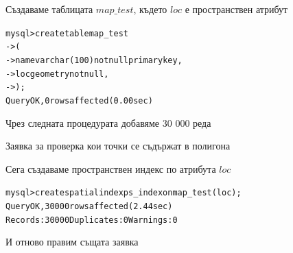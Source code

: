 \documentclass{beamer}
\begin{document}



\begin{frame}[fragile]
\begin{beamerboxesrounded}{Създаваме таблицата $map\_test$, където $loc$ е пространствен атрибут}
\begin{alltt}
mysql> create table map_test
    -> (
    ->   name varchar(100) not null primary key,
    ->   \alert{loc  geometry not null},
    -> );
Query OK, 0 rows affected (0.00 sec)
\end{alltt}
\end{beamerboxesrounded}
\end{frame}
\begin{frame}[fragile]
\begin{beamerboxesrounded}{Чрез следната процедурата добавяме 30 000 реда}
\tiny{}
\end{beamerboxesrounded}
\end{frame}

\begin{frame}[fragile]
\begin{beamerboxesrounded}{Заявка за проверка кои точки се съдържат в полигона}

\end{beamerboxesrounded}
\end{frame}

\begin{frame}[fragile]
\begin{beamerboxesrounded}{Сега създаваме пространствен индекс по атрибута $loc$}
\begin{alltt}

mysql> create spatial index ps_index on map_test(loc);
Query OK, 30000 rows affected (2.44 sec)
Records: 30000  Duplicates: 0  Warnings: 0
\end{alltt}
\end{beamerboxesrounded}
\end{frame}

\begin{frame}[fragile]
\begin{beamerboxesrounded}{И отново правим същата заявка}

\end{beamerboxesrounded}
\end{frame}
\end{document}
